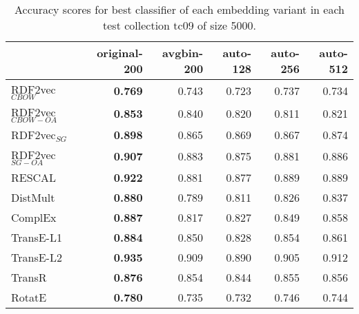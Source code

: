 \documentclass[11pt,titlepage,oneside,openany]{book}
\begin{document}
\begin{table}[h!]
\centering
\begin{tabular}{lrrrrr}
\toprule
{} &  original-200 &  avgbin-200 &  auto-128 &  auto-256 &  auto-512 \\
\midrule
RDF2vec$_{CBOW}$     &	\textbf{0.769} &       0.743  &     0.723  &     0.737  &     0.734  \\
RDF2vec$_{CBOW-OA}$  &	\textbf{0.853} &       0.840  &     0.820  &     0.811  &     0.821  \\
RDF2vec$_{SG}$       &	\textbf{0.898} &       0.865  &     0.869  &     0.867  &     0.874  \\
RDF2vec$_{SG-OA}$    &	\textbf{0.907} &       0.883  &     0.875  &     0.881  &     0.886  \\
RESCAL               &	\textbf{0.922} &       0.881  &     0.877  &     0.889  &     0.889  \\
DistMult             &	\textbf{0.880} &       0.789  &     0.811  &     0.826  &     0.837  \\
ComplEx              &	\textbf{0.887} &       0.817  &     0.827  &     0.849  &     0.858  \\
TransE-L1            &	\textbf{0.884} &       0.850  &     0.828  &     0.854  &     0.861  \\
TransE-L2            &	\textbf{0.935} &       0.909  &     0.890  &     0.905  &     0.912  \\
TransR               &	\textbf{0.876} &       0.854  &     0.844  &     0.855  &     0.856  \\
RotatE               &	\textbf{0.780} &       0.735  &     0.732  &     0.746  &     0.744  \\
\bottomrule
\end{tabular}
\caption{Accuracy scores for best classifier of each embedding variant in each test collection tc09 of size 5000.}
\label{tab:dlcc-acc-tc09-5000}
\end{table}
\end{document}
